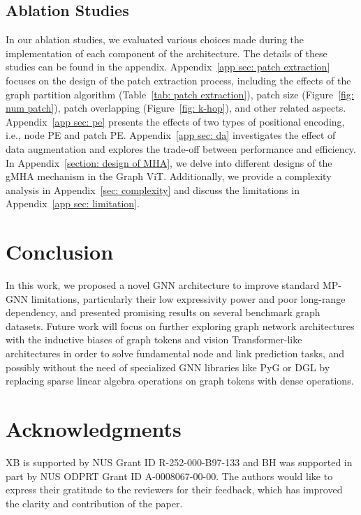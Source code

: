 \documentclass{article}
\begin{document}
\subsection{Ablation Studies}
In our ablation studies, we evaluated various choices made during the implementation of each component of the architecture. The details of these studies can be found in the appendix.
Appendix~\ref{app sec: patch extraction} focuses on the design of the patch extraction process, including the effects of the graph partition algorithm (Table~\ref{tab: patch extraction}), patch size (Figure~\ref{fig: num patch}), patch overlapping (Figure~\ref{fig: k-hop}), and other related aspects. Appendix~\ref{app sec: pe} presents the effects of two types of positional encoding, i.e., node PE and patch PE. Appendix~\ref{app sec: da} investigates the effect of data augmentation and explores the trade-off between performance and efficiency. In Appendix~\ref{section: design of MHA}, we delve into different designs of the gMHA mechanism in the Graph ViT. Additionally, we provide a complexity analysis in Appendix~\ref{sec: complexity} and discuss the limitations in Appendix~\ref{app sec: limitation}. 


\section{Conclusion}\label{sec: conclusion}
In this work, we proposed a novel GNN architecture to improve standard MP-GNN limitations, particularly their low expressivity power and poor long-range dependency, and presented promising results on several benchmark graph datasets. Future work will focus on further exploring graph network architectures with the inductive biases of graph tokens and vision Transformer-like architectures in order to solve fundamental node and link prediction tasks, and possibly without the need of specialized GNN libraries like PyG \citep{pyg} or DGL \citep{zheng2020dgl} by replacing sparse linear algebra operations on graph tokens with dense operations.


\section*{Acknowledgments}
XB is supported by NUS Grant ID R-252-000-B97-133 and BH was supported in part by NUS ODPRT Grant ID A-0008067-00-00. The authors would like to express their gratitude to the reviewers for their feedback, which has improved the clarity and contribution of the paper.
\end{document}
